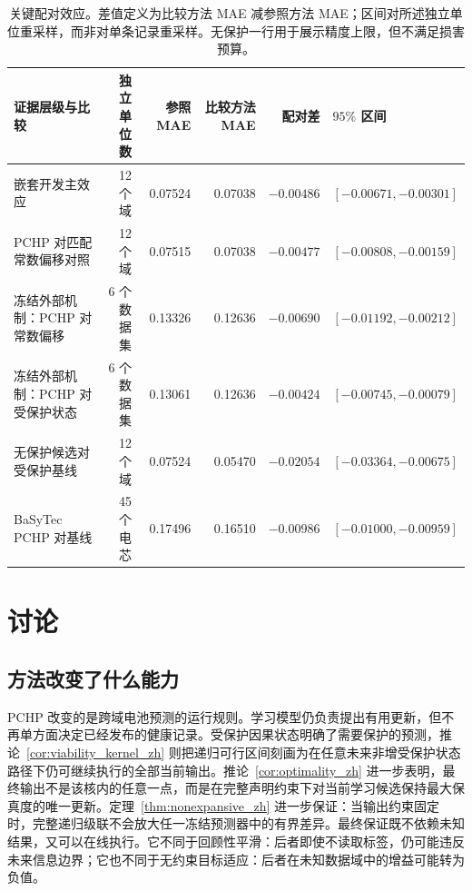 \documentclass[UTF8,11pt]{ctexart}
\begin{document}
\begin{table}[H]
\centering
\caption{关键配对效应。差值定义为比较方法 MAE 减参照方法 MAE；区间对所述独立单位重采样，而非对单条记录重采样。无保护一行用于展示精度上限，但不满足损害预算。}
\label{tab:primary_zh}
\small
\begin{tabularx}{\textwidth}{>{\raggedright\arraybackslash}Xrrrrl}
\toprule
证据层级与比较 & 独立单位数 & 参照 MAE & 比较方法 MAE & 配对差 & $95\%$ 区间 \\
\midrule
嵌套开发主效应 & 12 个域 & 0.07524 & 0.07038 & $-0.00486$ & $[-0.00671,-0.00301]$ \\
PCHP 对匹配常数偏移对照 & 12 个域 & 0.07515 & 0.07038 & $-0.00477$ & $[-0.00808,-0.00159]$ \\
冻结外部机制：PCHP 对常数偏移 & 6 个数据集 & 0.13326 & 0.12636 & $-0.00690$ & $[-0.01192,-0.00212]$ \\
冻结外部机制：PCHP 对受保护状态 & 6 个数据集 & 0.13061 & 0.12636 & $-0.00424$ & $[-0.00745,-0.00079]$ \\
无保护候选对受保护基线 & 12 个域 & 0.07524 & 0.05470 & $-0.02054$ & $[-0.03364,-0.00675]$ \\
BaSyTec PCHP 对基线 & 45 个电芯 & 0.17496 & 0.16510 & $-0.00986$ & $[-0.01000,-0.00959]$ \\
\bottomrule
\end{tabularx}
\end{table}

\section{讨论}

\subsection{方法改变了什么能力}

PCHP 改变的是跨域电池预测的运行规则。学习模型仍负责提出有用更新，但不再单方面决定已经发布的健康记录。受保护因果状态明确了需要保护的预测，推论~\ref{cor:viability_kernel_zh} 则把递归可行区间刻画为在任意未来非增受保护状态路径下仍可继续执行的全部当前输出。推论~\ref{cor:optimality_zh} 进一步表明，最终输出不是该核内的任意一点，而是在完整声明约束下对当前学习候选保持最大保真度的唯一更新。定理~\ref{thm:nonexpansive_zh} 进一步保证：当输出约束固定时，完整递归级联不会放大任一冻结预测器中的有界差异。最终保证既不依赖未知结果，又可以在线执行。它不同于回顾性平滑：后者即使不读取标签，仍可能违反未来信息边界；它也不同于无约束目标适应：后者在未知数据域中的增益可能转为负值。
\end{document}
